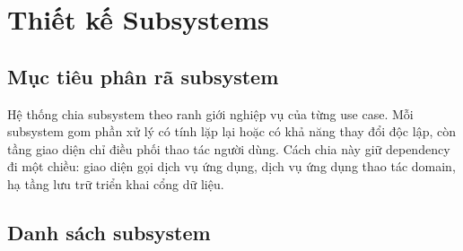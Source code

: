 \chapter{Thiết kế Subsystems}

\section{Mục tiêu phân rã subsystem}

Hệ thống chia subsystem theo ranh giới nghiệp vụ của từng use case. Mỗi subsystem gom phần xử lý có tính lặp lại hoặc có khả năng thay đổi độc lập, còn tầng giao diện chỉ điều phối thao tác người dùng. Cách chia này giữ dependency đi một chiều: giao diện gọi dịch vụ ứng dụng, dịch vụ ứng dụng thao tác domain, hạ tầng lưu trữ triển khai cổng dữ liệu.

\section{Danh sách subsystem}

